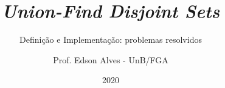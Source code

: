 \title{\it Union-Find Disjoint Sets}
\subtitle{Definição e Implementação: problemas resolvidos}
\author{Prof. Edson Alves - UnB/FGA}
\date{2020}
